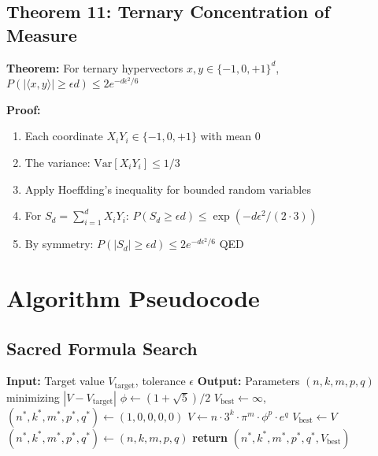 \documentclass[aps,prd,preprint,superscriptaddress,showpacs,nofootinbib,longbibliography]{revtex4-2}
\begin{document}
\subsection{Theorem 11: Ternary Concentration of Measure}

\textbf{Theorem:} For ternary hypervectors $x, y \in \{-1,0,+1\}^d$, $P(|\langle x, y \rangle| \geq \epsilon d) \leq 2e^{-d\epsilon^2/6}$

\textbf{Proof:}
\begin{enumerate}
    \item Each coordinate $X_i Y_i \in \{-1, 0, +1\}$ with mean 0
    \item The variance: $\text{Var}[X_i Y_i] \leq 1/3$
    \item Apply Hoeffding's inequality for bounded random variables
    \item For $S_d = \sum_{i=1}^d X_i Y_i$: $P(S_d \geq \epsilon d) \leq \exp(-d\epsilon^2/(2 \cdot 3))$
    \item By symmetry: $P(|S_d| \geq \epsilon d) \leq 2e^{-d\epsilon^2/6}$ \hfill QED
\end{enumerate}

\section{Algorithm Pseudocode}
\label{app:algorithms}

\subsection{Sacred Formula Search}

\begin{algorithmic}[1]
\State \textbf{Input:} Target value $V_{\text{target}}$, tolerance $\epsilon$
\State \textbf{Output:} Parameters $(n,k,m,p,q)$ minimizing $|V - V_{\text{target}}|$
\State
\State $\phi \gets (1 + \sqrt{5})/2$
\State $V_{\text{best}} \gets \infty$, $(n^*, k^*, m^*, p^*, q^*) \gets (1, 0, 0, 0, 0)$
                    \State $V \gets n \cdot 3^k \cdot \pi^m \cdot \phi^p \cdot e^q$
                        \State $V_{\text{best}} \gets V$
                        \State $(n^*, k^*, m^*, p^*, q^*) \gets (n, k, m, p, q)$
                    \EndIf
                \EndFor
            \EndFor
        \EndFor
    \EndFor
\EndFor
\State \textbf{return} $(n^*, k^*, m^*, p^*, q^*, V_{\text{best}})$
\end{algorithmic}
\end{document}
